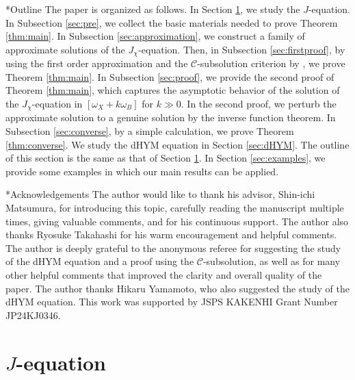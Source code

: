 \documentclass{amsart}
\numberwithin{equation}{section}
\theoremstyle{plain}
\theoremstyle{definition}
\theoremstyle{remark}
\begin{document}
\begin{subsection}*{Outline}
The paper is organized as follows. In Section \ref{sec:J}, we study the $J$-equation.
In Subsection \ref{sec:pre}, we collect the basic materials needed to prove Theorem \ref{thm:main}. 
In Subsection \ref{sec:approximation}, we construct a family of approximate solutions of the $J_\chi$-equation. Then, in Subsection \ref{sec:firstproof}, by using the first order approximation and the $\mathcal{C}$-subsolution criterion by \cite{SW}, we prove Theorem \ref{thm:main}.
In Subsection \ref{sec:proof}, we provide the second proof of Theorem \ref{thm:main}, which captures the asymptotic behavior of the solution of the $J_\chi$-equation in $[\omega_X+k\omega_B]$ for $k\gg0$.
In the second proof, we perturb the approximate solution to a genuine solution by the inverse function theorem.
In Subsection \ref{sec:converse}, by a simple calculation, we prove Theorem \ref{thm:converse}. 
We study the dHYM equation in Section \ref{sec:dHYM}. The outline of this section is the same as that of Section \ref{sec:J}. In Section \ref{sec:examples}, we provide some examples in which our main results can be applied.
\end{subsection}

\begin{subsection}*{Acknowledgements}
The author would like to thank his advisor, Shin-ichi Matsumura, for introducing this topic, carefully reading the manuscript multiple times, giving valuable comments, and for his continuous support.  
The author also thanks Ryosuke Takahashi for his warm encouragement and helpful comments.  
The author is deeply grateful to the anonymous referee for suggesting the study of the dHYM equation and a proof using the $\mathcal{C}$-subsolution, as well as for many other helpful comments that improved the clarity and overall quality of the paper.  
The author thanks Hikaru Yamamoto, who also suggested the study of the dHYM equation.  
This work was supported by JSPS KAKENHI Grant Number JP24KJ0346.
\end{subsection}

\section{$J$-equation}\label{sec:J}
\end{document}
